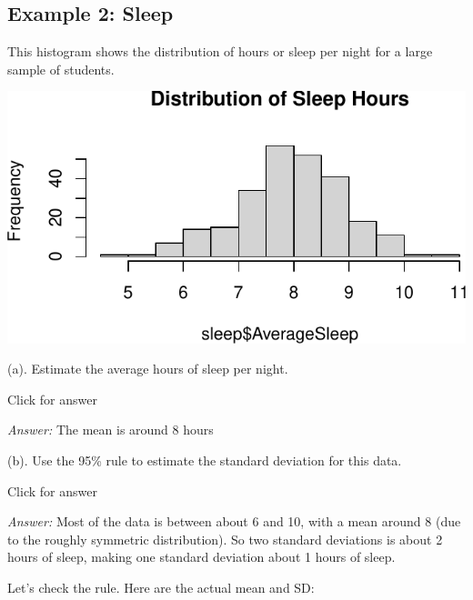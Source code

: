 \documentclass[
]{book}
\newenvironment{Shaded}{\begin{snugshade}}{\end{snugshade}}
\newcommand{\AttributeTok}[1]{\textcolor[rgb]{0.77,0.63,0.00}{#1}}
\newcommand{\FunctionTok}[1]{\textcolor[rgb]{0.00,0.00,0.00}{#1}}
\newcommand{\NormalTok}[1]{#1}
\newcommand{\OtherTok}[1]{\textcolor[rgb]{0.56,0.35,0.01}{#1}}
\newcommand{\SpecialCharTok}[1]{\textcolor[rgb]{0.00,0.00,0.00}{#1}}
\newcommand{\StringTok}[1]{\textcolor[rgb]{0.31,0.60,0.02}{#1}}
\begin{document}
\hypertarget{example-2-sleep}{%
\subsection{Example 2: Sleep}\label{example-2-sleep}}

This histogram shows the distribution of hours or sleep per night for a large sample of students.

\begin{Shaded}
\end{Shaded}

\includegraphics[width=1\linewidth]{Class_Activity_5_files/figure-latex/unnamed-chunk-16-1}

(a). Estimate the average hours of sleep per night.

Click for answer

\emph{Answer:} The mean is around 8 hours

(b). Use the 95\% rule to estimate the standard deviation for this data.

Click for answer

\emph{Answer:} Most of the data is between about 6 and 10, with a mean around 8 (due to the roughly symmetric distribution). So two standard deviations is about 2 hours of sleep, making one standard deviation about 1 hours of sleep.

Let's check the rule. Here are the actual mean and SD:
\end{document}

